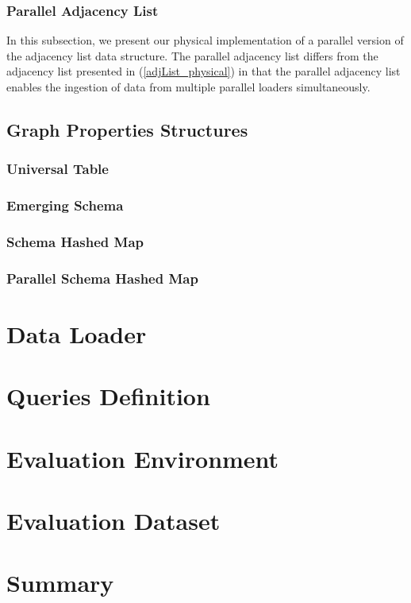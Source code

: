 {\begin{itemize}
\end{itemize}


\subsubsection{Parallel Adjacency List}

In this subsection, we present our physical implementation of a parallel version of the adjacency list data structure. The parallel adjacency list differs from the adjacency list presented in (\ref{adjList_physical}) in that the parallel adjacency list enables the ingestion of data from multiple parallel loaders simultaneously.



\subsection{Graph Properties Structures}
\label{GraphPropertiesImp}


\subsubsection{Universal Table}


\subsubsection{Emerging Schema}


\subsubsection{Schema Hashed Map}


\subsubsection{Parallel Schema Hashed Map}



\section{Data Loader}
\label{dataLoader}


\section{Queries Definition}
\label{qryDef}


\section{Evaluation Environment}
\label{evalEnv}


\section{Evaluation Dataset}
\label{dataset}


\section{Summary}
\label{summary}

}